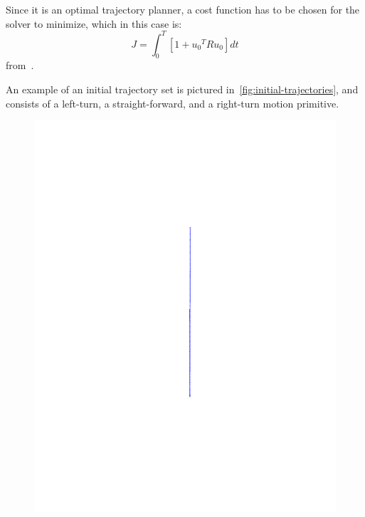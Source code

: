 Since it is an optimal trajectory planner, a cost function has to be chosen for
the solver to minimize, which in this case is:
\begin{equation}
  J = \int_{0}^{T} \left[ 1 + {u_{0}}^{T}Ru_{0} \right] dt
\end{equation}
from~\cite{majumdarRobustOnlineMotion2013}.

An example of an initial trajectory set is pictured
in~\ref{fig:initial-trajectories}, and consists of a left-turn, a
straight-forward, and a right-turn motion primitive.

\begin{figure}
  \centering
  \begin{minipage}[b]{0.2\textwidth}
    \includegraphics[width=\textwidth]{figures/method/straight-trajector}
  \end{minipage}
  \hfill
  \begin{minipage}[b]{0.2\textwidth}

\end{minipage}
\end{figure}
